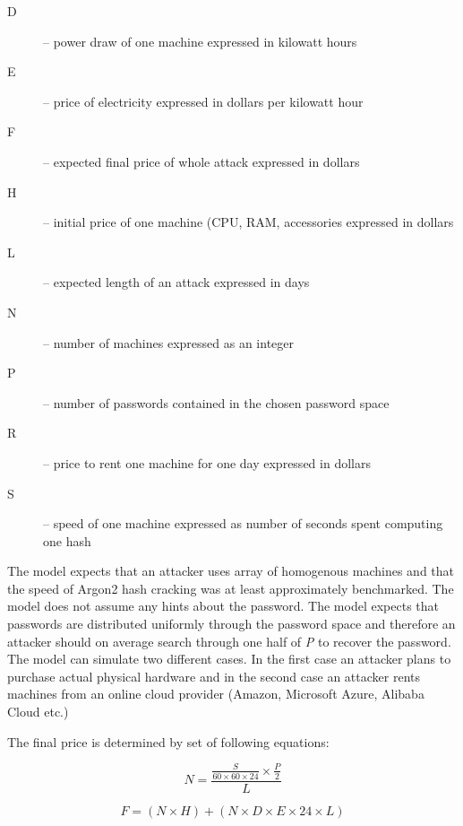 \documentclass[nolof]{fithesis3}
\begin{document}
\begin{description}
\item[D] -- power draw of one machine expressed in kilowatt hours

\item[E] -- price of electricity expressed in dollars per kilowatt hour

\item[F] -- expected final price of whole attack expressed in dollars

\item[H] -- initial price of one machine (CPU, RAM, accessories expressed in dollars

\item[L] -- expected length of an attack expressed in days

\item[N] -- number of machines expressed as an integer

\item[P] -- number of passwords contained in the chosen password space

\item[R] -- price to rent one machine for one day expressed in dollars

\item[S] -- speed of one machine expressed as number of seconds spent computing one hash
\end{description}

The model expects that an attacker uses array of homogenous machines and that the speed of Argon2 hash cracking was at least approximately benchmarked. The model does not assume any hints about the password. The model expects that passwords are distributed uniformly through the password space and therefore an attacker should on average search through one half of \emph{P} to recover the password. The model can simulate two different cases. In the first case an attacker plans to purchase actual physical hardware and in the second case an attacker rents machines from an online cloud provider (Amazon, Microsoft Azure, Alibaba Cloud etc.)

The final price is determined by set of following equations:

\begin{equation}
\label{eq1}
N = \frac{\frac{S}{60 \times 60 \times 24} \times \frac{P}{2}}{L}
\end{equation}

\begin{equation}
\label{eq2}
F = ( N \times H ) + ( N \times D \times E \times 24 \times L)
\end{equation}
\end{document}
